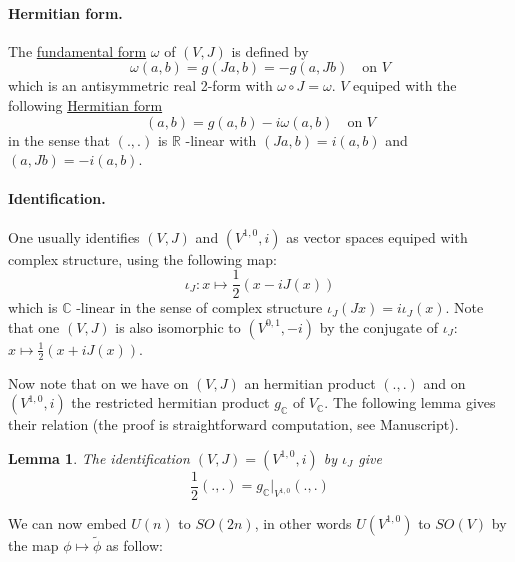 \documentclass[11pt]{article}
\newtheorem{lemma}[theorem]{Lemma}
\begin{document}
\paragraph*{Hermitian form.}
\label{sec:org7a3cbfc}
The \uline{fundamental form} \(\omega\) of \((V,J)\) is defined by
\[
\omega(a,b) = g(Ja,b) = -g(a, Jb) \quad \text{on } V
\]
which is an antisymmetric real 2-form with \(\omega\circ J = \omega\). \(V\) equiped with the following
\uline{Hermitian form}
\[
(a,b) = g(a,b) - i\omega(a,b)  \quad \text{on } V
\]
in the sense that \((.,.)\) is \(\mathbb{R}\) -linear with \((Ja,b) = i(a,b)\) and \((a,Jb) = -i(a,b)\).

\paragraph*{Identification.}
\label{sec:org0816c17}
One usually identifies \((V,J)\) and \((V^{1,0},i)\) as vector spaces equiped with complex structure,
using the following map:
\[
\iota_J: x \mapsto \frac{1}{2}(x - iJ(x))
\]
which is \(\mathbb{C}\) -linear in the sense of complex structure \(\iota_J(Jx) = i\iota_J(x)\). Note
that one \((V,J)\) is also isomorphic to \((V^{0,1},-i)\) by the conjugate of \(\iota_J\): \(x\mapsto
\frac{1}{2}(x + iJ(x))\).

Now note that on we have on \((V,J)\) an hermitian product \((.,.)\) and on \((V^{1,0},i)\) the restricted
hermitian product \(g_{\mathbb{C}}\) of \(V_{\mathbb{C}}\). The following lemma gives their relation
(the proof is straightforward computation, see Manuscript).

\begin{lemma}
The identification \((V,J) = (V^{1,0},i)\) by \(\iota_J\) give
\[
\frac{1}{2}(.,.) = g_\mathbb{C}|_{V^{1,0}}(.,.)
\]
\end{lemma}


We can now embed \(U(n)\) to \(SO(2n)\), in other words \(U(V^{1,0})\) to \(SO(V)\) by the map
\(\phi\mapsto \tilde\phi\) as follow:
\end{document}

